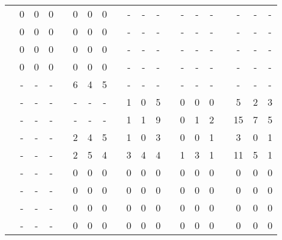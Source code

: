 \begin{center}
{\begin{longtable}{L{5cm} c c c p{.5cm} c c c p{.5cm} c c c p{.5cm} c c c p{.5cm} c c c}
 & 0 & 0 & 0 & & 0 & 0 & 0 & & - & - & - & & - & - & - & & - & - & - \\[.3em]
 & 0 & 0 & 0 & & 0 & 0 & 0 & & - & - & - & & - & - & - & & - & - & - \\[.3em]
 & 0 & 0 & 0 & & 0 & 0 & 0 & & - & - & - & & - & - & - & & - & - & - \\[.3em]
 & 0 & 0 & 0 & & 0 & 0 & 0 & & - & - & - & & - & - & - & & - & - & - \\[.3em]
 & - & - & - & & 6 & 4 & 5 & & - & - & - & & - & - & - & & - & - & - \\[.3em]
 & - & - & - & & - & - & - & & 1 & 0 & 5 & & 0 & 0 & 0 & & 5 & 2 & 3 \\[.3em]
 & - & - & - & & - & - & - & & 1 & 1 & 9 & & 0 & 1 & 2 & & 15 & 7 & 5 \\[.3em]
 & - & - & - & & 2 & 4 & 5 & & 1 & 0 & 3 & & 0 & 0 & 1 & & 3 & 0 & 1 \\[.3em]
 & - & - & - & & 2 & 5 & 4 & & 3 & 4 & 4 & & 1 & 3 & 1 & & 11 & 5 & 1 \\[.3em]
 & - & - & - & & 0 & 0 & 0 & & 0 & 0 & 0 & & 0 & 0 & 0 & & 0 & 0 & 0 \\[.3em]
 & - & - & - & & 0 & 0 & 0 & & 0 & 0 & 0 & & 0 & 0 & 0 & & 0 & 0 & 0 \\[.3em]
 & - & - & - & & 0 & 0 & 0 & & 0 & 0 & 0 & & 0 & 0 & 0 & & 0 & 0 & 0 \\[.3em]
 & - & - & - & & 0 & 0 & 0 & & 0 & 0 & 0 & & 0 & 0 & 0 & & 0 & 0 & 0 \\[.3em]
\hline
\end{longtable}
}
\end{center}
